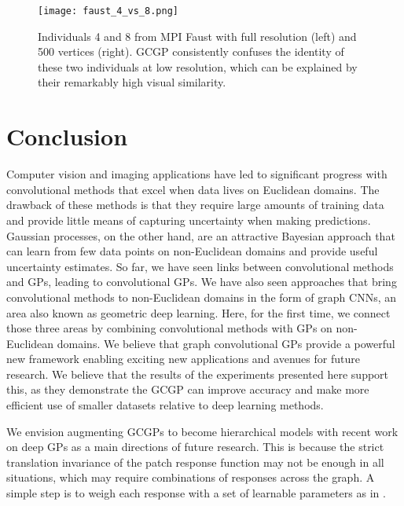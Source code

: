 \documentclass{article}
\begin{document}
\begin{figure}[t]
\centering
\texttt{[image: faust\_4\_vs\_8.png]}
\caption{Individuals 4 and 8 from MPI Faust with full resolution (left) and 500 vertices (right). GCGP consistently confuses the identity of these two individuals at low resolution, which can be explained by their remarkably high visual similarity.} \label{fig:faust_4_vs_8}
\vspace{-.3cm}
\end{figure}

\section{Conclusion}

Computer vision and imaging applications have led to significant progress with convolutional methods that excel when data lives on Euclidean domains. The drawback of these methods is that they require large amounts of training data and provide little means of capturing uncertainty when making predictions. Gaussian processes, on the other hand, are an attractive Bayesian approach that can learn from few data points on non-Euclidean domains and provide useful uncertainty estimates. So far, we have seen links between convolutional methods and GPs, leading to convolutional GPs. We have also seen approaches that bring convolutional methods to non-Euclidean domains in the form of graph CNNs, an area also known as geometric deep learning. Here, for the first time, we connect those three areas by combining convolutional methods with GPs on non-Euclidean domains. We believe that graph convolutional GPs provide a powerful new framework enabling exciting new applications and avenues for future research. We believe that the results of the experiments presented here support this, as they demonstrate the GCGP can improve accuracy and make more efficient use of smaller datasets relative to deep learning methods.



We envision augmenting GCGPs to become hierarchical models with recent work on deep GPs \citep{damianou2013deep} as a main directions of future research. This is because the strict translation invariance of the patch response function may not be enough in all situations, which may require combinations of responses across the graph. A simple step is to weigh each response with a set of learnable parameters as in \citep{convgp}.
\end{document}
